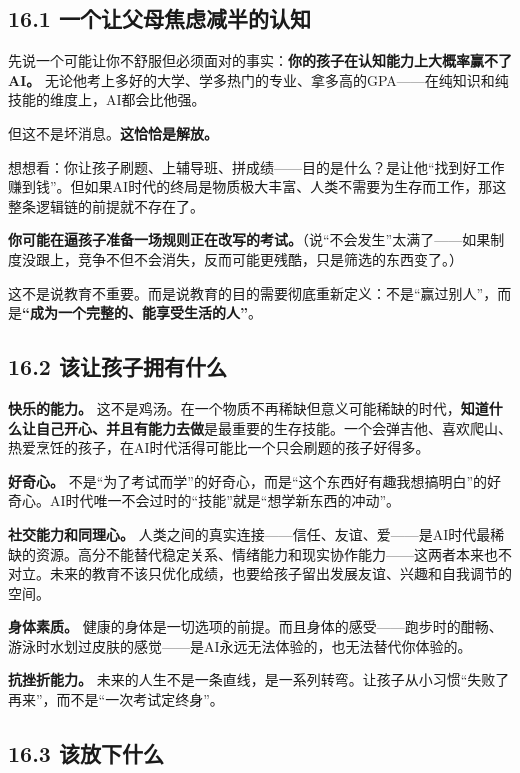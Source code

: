 \documentclass[11pt,a4paper]{ctexart}
\begin{document}
\subsection{16.1 一个让父母焦虑减半的认知}

先说一个可能让你不舒服但必须面对的事实：\textbf{你的孩子在认知能力上大概率赢不了AI。} 无论他考上多好的大学、学多热门的专业、拿多高的GPA——在纯知识和纯技能的维度上，AI都会比他强。

但这不是坏消息。\textbf{这恰恰是解放。}

想想看：你让孩子刷题、上辅导班、拼成绩——目的是什么？是让他“找到好工作赚到钱”。但如果AI时代的终局是物质极大丰富、人类不需要为生存而工作，那这整条逻辑链的前提就不存在了。

\textbf{你可能在逼孩子准备一场规则正在改写的考试。}（说“不会发生”太满了——如果制度没跟上，竞争不但不会消失，反而可能更残酷，只是筛选的东西变了。）

这不是说教育不重要。而是说教育的目的需要彻底重新定义：不是“赢过别人”，而是\textbf{“成为一个完整的、能享受生活的人”}。

\subsection{16.2 该让孩子拥有什么}

\textbf{快乐的能力。} 这不是鸡汤。在一个物质不再稀缺但意义可能稀缺的时代，\textbf{知道什么让自己开心、并且有能力去做}是最重要的生存技能。一个会弹吉他、喜欢爬山、热爱烹饪的孩子，在AI时代活得可能比一个只会刷题的孩子好得多。

\textbf{好奇心。} 不是“为了考试而学”的好奇心，而是“这个东西好有趣我想搞明白”的好奇心。AI时代唯一不会过时的“技能”就是“想学新东西的冲动”。

\textbf{社交能力和同理心。} 人类之间的真实连接——信任、友谊、爱——是AI时代最稀缺的资源。高分不能替代稳定关系、情绪能力和现实协作能力——这两者本来也不对立。未来的教育不该只优化成绩，也要给孩子留出发展友谊、兴趣和自我调节的空间。

\textbf{身体素质。} 健康的身体是一切选项的前提。而且身体的感受——跑步时的酣畅、游泳时水划过皮肤的感觉——是AI永远无法体验的，也无法替代你体验的。

\textbf{抗挫折能力。} 未来的人生不是一条直线，是一系列转弯。让孩子从小习惯“失败了再来”，而不是“一次考试定终身”。

\subsection{16.3 该放下什么}
\end{document}
